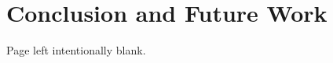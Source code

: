 \documentclass[11pt]{report}
\begin{document}
\chapter{Conclusion and Future Work}


\newpage
{} 
{} 
\printbibliography[title={References}]

\appendix


\newpage
\begin{center}
	\thispagestyle{empty}
	\vspace*{\fill}
	Page left intentionally blank.
	\vspace*{\fill}
\end{center}
\newpage
\end{document}

